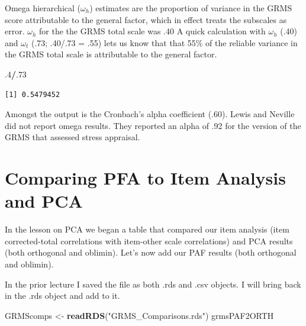 \documentclass[
  english,
]{book}
\newenvironment{Shaded}{\begin{snugshade}}{\end{snugshade}}
\newcommand{\DecValTok}[1]{\textcolor[rgb]{0.00,0.00,0.81}{#1}}
\newcommand{\FloatTok}[1]{\textcolor[rgb]{0.00,0.00,0.81}{#1}}
\newcommand{\KeywordTok}[1]{\textcolor[rgb]{0.13,0.29,0.53}{\textbf{#1}}}
\newcommand{\NormalTok}[1]{#1}
\newcommand{\OperatorTok}[1]{\textcolor[rgb]{0.81,0.36,0.00}{\textbf{#1}}}
\newcommand{\StringTok}[1]{\textcolor[rgb]{0.31,0.60,0.02}{#1}}
\begin{document}
Omega hierarchical (\(\omega_{h}\)) estimates are the proportion of variance in the GRMS score attributable to the general factor, which in effect treats the subscales as error. \(\omega_{h}\) for the the GRMS total scale was .40 A quick calculation with \(\omega_{h}\) (.40) and \(\omega_{t}\) (.73; .40/.73 = .55) lets us know that that 55\% of the reliable variance in the GRMS total scale is attributable to the general factor.

\begin{Shaded}
\begin{Highlighting}[]
\FloatTok{.4}\OperatorTok{/}\NormalTok{.}\DecValTok{73}
\end{Highlighting}
\end{Shaded}

\begin{verbatim}
[1] 0.5479452
\end{verbatim}

Amongst the output is the Cronbach's alpha coefficient (.60). Lewis and Neville \citeyearpar{lewis_construction_2015} did not report omega results. They reported an alpha of .92 for the version of the GRMS that assessed stress appraisal.

\hypertarget{comparing-pfa-to-item-analysis-and-pca}{%
\section{Comparing PFA to Item Analysis and PCA}\label{comparing-pfa-to-item-analysis-and-pca}}

In the lesson on PCA we began a table that compared our item analysis (item corrected-total correlations with item-other scale correlations) and PCA results (both orthogonal and oblimin). Let's now add our PAF results (both orthogonal and oblimin).

In the prior lecture I saved the file as both .rds and .csv objects. I will bring back in the .rds object and add to it.

\begin{Shaded}
\begin{Highlighting}[]
\NormalTok{GRMScomps <-}\StringTok{ }\KeywordTok{readRDS}\NormalTok{(}\StringTok{"GRMS_Comparisons.rds"}\NormalTok{)}
\NormalTok{grmsPAF2ORTH}
\end{Highlighting}
\end{Shaded}
\end{document}
